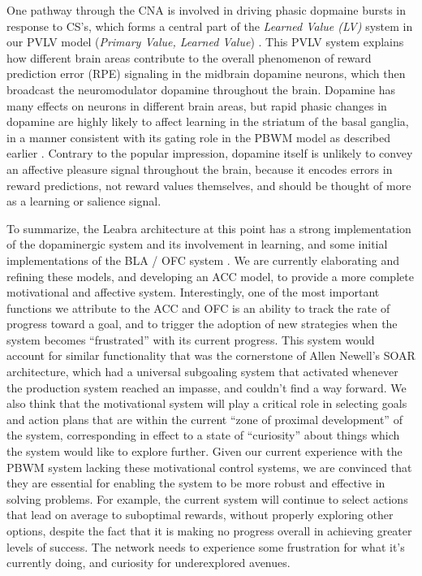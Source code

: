 \documentclass[11pt,twoside]{article}
\begin{document}
One pathway through the CNA is involved in driving phasic dopmaine
bursts in response to CS's, which forms a central part of the {\em
  Learned Value (LV)} system in our PVLV model ({\em Primary Value,
  Learned Value}) \cite{OReillyEtAl08,HazyEtAl10}.  This PVLV system
explains how different brain areas contribute to the overall
phenomenon of reward prediction error (RPE) signaling in the midbrain
dopamine neurons, which then broadcast the neuromodulator dopamine
throughout the brain.  Dopamine has many effects on neurons in
different brain areas, but rapid phasic changes in dopamine are highly
likely to affect learning in the striatum of the basal ganglia, in a
manner consistent with its gating role in the PBWM model as described
earlier \cite{Frank05}.  Contrary to the popular impression, dopamine
itself is unlikely to convey an affective pleasure signal throughout
the brain, because it encodes errors in reward predictions, not reward
values themselves, and should be thought of more as a learning or
salience signal.

To summarize, the Leabra architecture at this point has a strong
implementation of the dopaminergic system and its involvement in
learning, and some initial implementations of the BLA / OFC system
\cite{PauliHazyOReilly12l}.  We are currently elaborating and refining
these models, and developing an ACC model, to provide a more complete
motivational and affective system.  Interestingly, one of the most
important functions we attribute to the ACC and OFC is an ability to
track the rate of progress toward a goal, and to trigger the adoption
of new strategies when the system becomes ``frustrated'' with its
current progress.  This system would account for similar functionality
that was the cornerstone of Allen Newell's SOAR architecture, which
had a universal subgoaling system that activated whenever the
production system reached an impasse, and couldn't find a way forward.
We also think that the motivational system will play a critical role
in selecting goals and action plans that are within the current ``zone
of proximal development'' of the system, corresponding in effect to a
state of ``curiosity'' about things which the system would like to
explore further.  Given our current experience with the PBWM system
lacking these motivational control systems, we are convinced that they
are essential for enabling the system to be more robust and effective
in solving problems.  For example, the current system will continue to
select actions that lead on average to suboptimal rewards, without
properly exploring other options, despite the fact that it is making
no progress overall in achieving greater levels of success.  The
network needs to experience some frustration for what it's currently
doing, and curiosity for underexplored avenues.
\end{document}
